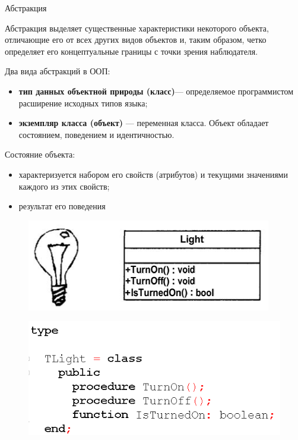 \documentclass{beamer}
\begin{document}
\begin{frame}{Абстракция}
\begin{block}{Абстракция}
выделяет существенные характеристики некоторого объекта, отличающие его от всех других видов объектов и, таким образом, четко определяет его концептуальные границы с точки зрения наблюдателя.
\end{block}
Два вида абстракций в ООП:
\begin{itemize}
\item \textbf{тип данных объектной природы (класс)}— определяемое программистом
расширение исходных типов языка;
\item \textbf{экземпляр класса (объект)} — переменная класса. Объект обладает состоянием, поведением и идентичностью.
\end{itemize}
Состояние объекта:
\begin{itemize}
\item характеризуется набором его свойств (атрибутов) и текущими значениями каждого из этих свойств;
\item результат его поведения
\end{itemize}
\end{frame}

\begin{frame}[t]
\begin{figure}[h]
\centering
\includegraphics[scale=0.75]{images/lec04-pic04.png}
\end{figure}
\begin{figure}[h]
\centering
\includegraphics[scale=0.75]{images/lec04-pic05.png}
\end{figure}
\end{frame}
\end{document}
